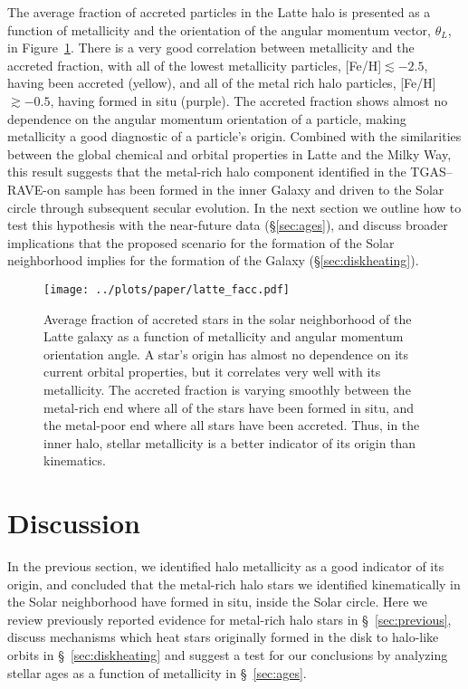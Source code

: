 \documentclass[apj, twocolappendix, numberedappendix, appendixfloats]{emulateapj}
\begin{document}
The average fraction of accreted particles in the Latte halo is presented as a function of metallicity and the orientation of the angular momentum vector, $\theta_L$, in Figure~\ref{fig:facc}.
There is a very good correlation between metallicity and the accreted fraction, with all of the lowest metallicity particles, [Fe/H]$\lesssim-2.5$, having been accreted (yellow), and all of the metal rich halo particles, [Fe/H]$\gtrsim-0.5$, having formed in situ (purple).
The accreted fraction shows almost no dependence on the angular momentum orientation of a particle, making metallicity a good diagnostic of a particle's origin.
Combined with the similarities between the global chemical and orbital properties in Latte and the Milky Way, this result suggests that the metal-rich halo component identified in the TGAS--RAVE-on sample has been formed in the inner Galaxy and driven to the Solar circle through subsequent secular evolution.
In the next section we outline how to test this hypothesis with the near-future data (\S\ref{sec:ages}), and discuss broader implications that the proposed scenario for the formation of the Solar neighborhood implies for the formation of the Galaxy (\S\ref{sec:diskheating}).

\begin{figure}
\begin{center}
\texttt{[image: ../plots/paper/latte\_facc.pdf]}
\caption{Average fraction of accreted stars in the solar neighborhood of the Latte galaxy as a function of metallicity and angular momentum orientation angle.
A star's origin has almost no dependence on its current orbital properties, but it correlates very well with its metallicity.
The accreted fraction is varying smoothly between the metal-rich end where all of the stars have been formed in situ, and the metal-poor end where all stars have been accreted.
Thus, in the inner halo, stellar metallicity is a better indicator of its origin than kinematics.
}
\label{fig:facc}
\end{center}
\end{figure}

\section{Discussion}

In the previous section, we identified halo metallicity as a good indicator of its origin, and concluded that the metal-rich halo stars we identified kinematically in the Solar neighborhood have formed in situ, inside the Solar circle.
Here we review previously reported evidence for metal-rich halo stars in \S~\ref{sec:previous}, discuss mechanisms which heat stars originally formed in the disk to halo-like orbits in \S~\ref{sec:diskheating} and suggest a test for our conclusions by analyzing stellar ages as a function of metallicity in \S~\ref{sec:ages}.
\end{document}
